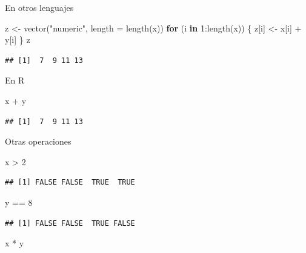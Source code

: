 \documentclass[
  12pt,
]{book}
\newenvironment{Shaded}{\begin{snugshade}}{\end{snugshade}}
\newcommand{\AttributeTok}[1]{\textcolor[rgb]{0.77,0.63,0.00}{#1}}
\newcommand{\ControlFlowTok}[1]{\textcolor[rgb]{0.13,0.29,0.53}{\textbf{#1}}}
\newcommand{\DecValTok}[1]{\textcolor[rgb]{0.00,0.00,0.81}{#1}}
\newcommand{\FunctionTok}[1]{\textcolor[rgb]{0.00,0.00,0.00}{#1}}
\newcommand{\NormalTok}[1]{#1}
\newcommand{\OtherTok}[1]{\textcolor[rgb]{0.56,0.35,0.01}{#1}}
\newcommand{\SpecialCharTok}[1]{\textcolor[rgb]{0.00,0.00,0.00}{#1}}
\newcommand{\StringTok}[1]{\textcolor[rgb]{0.31,0.60,0.02}{#1}}
\begin{document}
En otros lenguajes

\begin{Shaded}
\begin{Highlighting}[]
\NormalTok{z }\OtherTok{\textless{}{-}} \FunctionTok{vector}\NormalTok{(}\StringTok{"numeric"}\NormalTok{, }\AttributeTok{length =} \FunctionTok{length}\NormalTok{(x))}
\ControlFlowTok{for}\NormalTok{ (i }\ControlFlowTok{in} \DecValTok{1}\SpecialCharTok{:}\FunctionTok{length}\NormalTok{(x)) \{}
\NormalTok{  z[i] }\OtherTok{\textless{}{-}}\NormalTok{ x[i] }\SpecialCharTok{+}\NormalTok{ y[i]}
\NormalTok{\}}
\NormalTok{z}
\end{Highlighting}
\end{Shaded}

\begin{verbatim}
## [1]  7  9 11 13
\end{verbatim}

En R

\begin{Shaded}
\begin{Highlighting}[]
\NormalTok{x }\SpecialCharTok{+}\NormalTok{ y}
\end{Highlighting}
\end{Shaded}

\begin{verbatim}
## [1]  7  9 11 13
\end{verbatim}

Otras operaciones

\begin{Shaded}
\begin{Highlighting}[]
\NormalTok{x }\SpecialCharTok{\textgreater{}} \DecValTok{2}
\end{Highlighting}
\end{Shaded}

\begin{verbatim}
## [1] FALSE FALSE  TRUE  TRUE
\end{verbatim}

\begin{Shaded}
\begin{Highlighting}[]
\NormalTok{y }\SpecialCharTok{==} \DecValTok{8}
\end{Highlighting}
\end{Shaded}

\begin{verbatim}
## [1] FALSE FALSE  TRUE FALSE
\end{verbatim}

\begin{Shaded}
\begin{Highlighting}[]
\NormalTok{x }\SpecialCharTok{*}\NormalTok{ y}
\end{Highlighting}
\end{Shaded}
\end{document}
